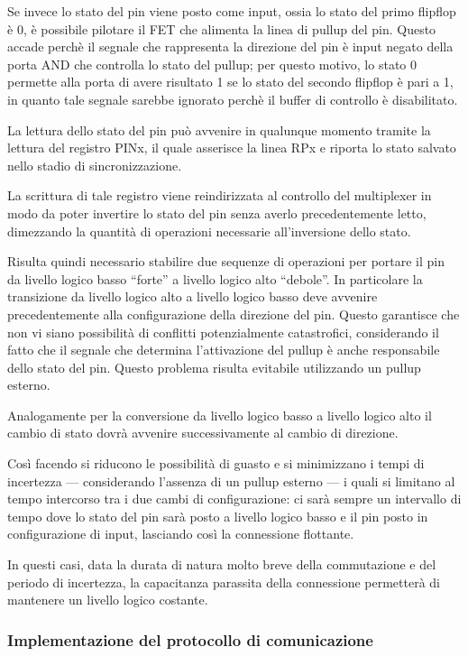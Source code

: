 Se invece lo stato del pin viene posto come input, ossia lo stato del primo flipflop è 0, è possibile pilotare il FET che alimenta la linea di pullup del pin. Questo accade perchè il segnale che rappresenta la direzione del pin è input negato della porta AND che controlla lo stato del pullup; per questo motivo, lo stato 0 permette alla porta di avere risultato 1 se lo stato del secondo flipflop è pari a 1, in quanto tale segnale sarebbe ignorato perchè il buffer di controllo è disabilitato.

La lettura dello stato del pin può avvenire in qualunque momento tramite la lettura del registro PINx, il quale asserisce la linea RPx e riporta lo stato salvato nello stadio di sincronizzazione.

La scrittura di tale registro viene reindirizzata al controllo del multiplexer in modo da poter invertire lo stato del pin senza averlo precedentemente letto, dimezzando la quantità di operazioni necessarie all'inversione dello stato.

Risulta quindi necessario stabilire due sequenze di operazioni per portare il pin da livello logico basso ``forte'' a livello logico alto ``debole''. In particolare la transizione da livello logico alto a livello logico basso deve avvenire precedentemente alla configurazione della direzione del pin. Questo garantisce che non vi siano possibilità di conflitti potenzialmente catastrofici, considerando il fatto che il segnale che determina l'attivazione del pullup è anche responsabile dello stato del pin. Questo problema risulta evitabile utilizzando un pullup esterno.

Analogamente per la conversione da livello logico basso a livello logico alto il cambio di stato dovrà avvenire successivamente al cambio di direzione.

Così facendo si riducono le possibilità di guasto e si minimizzano i tempi di incertezza --- considerando l'assenza di un pullup esterno --- i quali si limitano al tempo intercorso tra i due cambi di configurazione: ci sarà sempre un intervallo di tempo dove lo stato del pin sarà posto a livello logico basso e il pin posto in configurazione di input, lasciando così la connessione flottante.

In questi casi, data la durata di natura molto breve della commutazione e del periodo di incertezza, la capacitanza parassita della connessione permetterà di mantenere un livello logico costante.

\subsubsection{Implementazione del protocollo di comunicazione}

